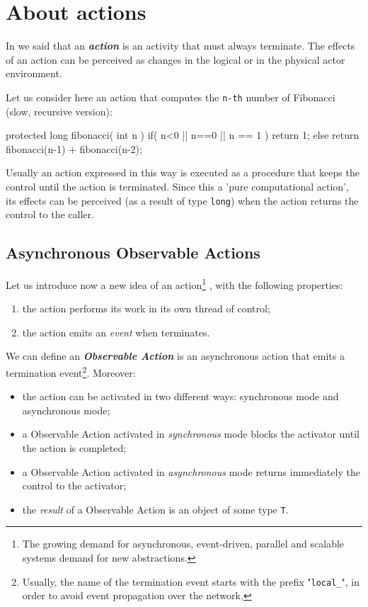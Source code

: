 \section{About actions}

In  we said that an \textit{\textbf{action}} is an activity that must always terminate. The effects of an action can be perceived as changes in the logical or in the physical actor environment.

Let us consider here an action that computes the \texttt{n-th} number of Fibonacci (slow, recursive version):

\begin{javacode}
	protected long fibonacci( int n ){
		if( n<0 || n==0 || n == 1 ) return 1;
		else return fibonacci(n-1) + fibonacci(n-2);
	}
\end{javacode}

Usually an action expressed in this way is executed as a procedure that keeps the control until the action is terminated. Since this a 'pure computational action', its effects can be perceived (as a result of type \texttt{long}) when the action returns the control to the caller.


\subsection{Asynchronous Observable Actions}

Let us introduce now a new idea of an action\footnote{The growing demand for asynchronous, event-driven, parallel and scalable systems demand for new abstractions.} , with the following properties:
\begin{enumerate}
\item the action performs its work in its own thread of control;
\item the action emits an \textit{event} when terminates.
\end{enumerate}

We can define an \textit{\textbf{Observable Action}} is an asynchronous action that emits a termination event\footnote{Usually, the name of the termination event starts with the prefix "\texttt{local\_}", in order to avoid event propagation over the network.}. Moreover:
\begin{itemize}
\item the action can be activated in two different ways: synchronous mode and asynchronous mode;
\item a Observable Action activated in  \textit{synchronous} mode blocks the activator until the action is completed;
\item a Observable Action activated in  \textit{asynchronous} mode returns immediately the control to the activator;
\item the \textit{result} of a Observable Action is an object of some type \texttt{T}.
\end{itemize}

